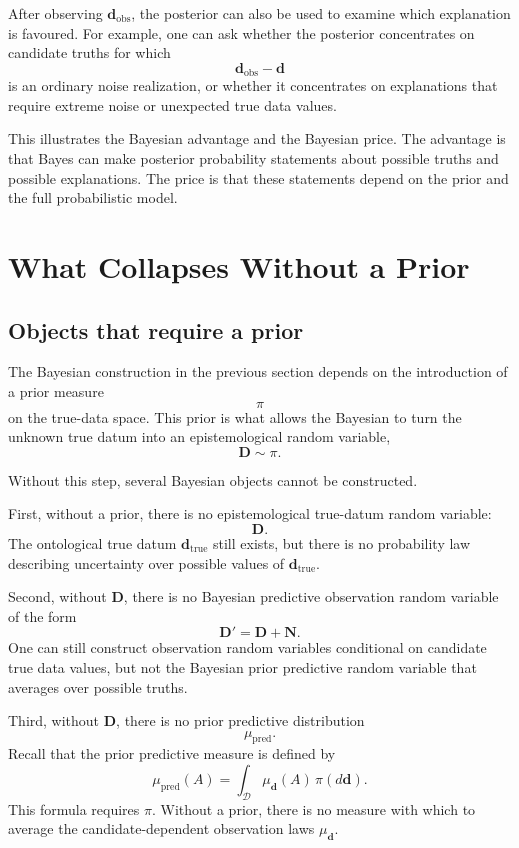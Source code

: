 \documentclass[11pt]{article}
\newcommand{\Dspace}{\mathcal D}
\newcommand{\prior}{\pi}
\newcommand{\Drand}{\mathbf D}
\newcommand{\Dobsrand}{\mathbf D'}
\newcommand{\Nrand}{\mathbf N}
\newcommand{\dtrue}{\mathbf d_{\mathrm{true}}}
\newcommand{\dobs}{\mathbf d_{\mathrm{obs}}}
\begin{document}
After observing \(\dobs\), the posterior can also be used to examine which explanation is favoured. For example, one can ask whether the posterior concentrates on candidate truths for which
\[
    \dobs-\mathbf d
\]
is an ordinary noise realization, or whether it concentrates on explanations that require extreme noise or unexpected true data values.

This illustrates the Bayesian advantage and the Bayesian price. The advantage is that Bayes can make posterior probability statements about possible truths and possible explanations. The price is that these statements depend on the prior and the full probabilistic model.

\section{What Collapses Without a Prior}

\subsection{Objects that require a prior}

The Bayesian construction in the previous section depends on the introduction of a prior measure
\[
    \prior
\]
on the true-data space. This prior is what allows the Bayesian to turn the unknown true datum into an epistemological random variable,
\[
    \Drand\sim\prior.
\]

Without this step, several Bayesian objects cannot be constructed.

First, without a prior, there is no epistemological true-datum random variable:
\[
    \Drand.
\]
The ontological true datum \(\dtrue\) still exists, but there is no probability law describing uncertainty over possible values of \(\dtrue\).

Second, without \(\Drand\), there is no Bayesian predictive observation random variable of the form
\[
    \Dobsrand=\Drand+\Nrand.
\]
One can still construct observation random variables conditional on candidate true data values, but not the Bayesian prior predictive random variable that averages over possible truths.

Third, without \(\Drand\), there is no prior predictive distribution
\[
    \mu_{\mathrm{pred}}.
\]
Recall that the prior predictive measure is defined by
\[
    \mu_{\mathrm{pred}}(A)
    =
    \int_{\Dspace}
        \mu_{\mathbf d}(A)
    \,\prior(d\mathbf d).
\]
This formula requires \(\prior\). Without a prior, there is no measure with which to average the candidate-dependent observation laws \(\mu_{\mathbf d}\).
\end{document}
